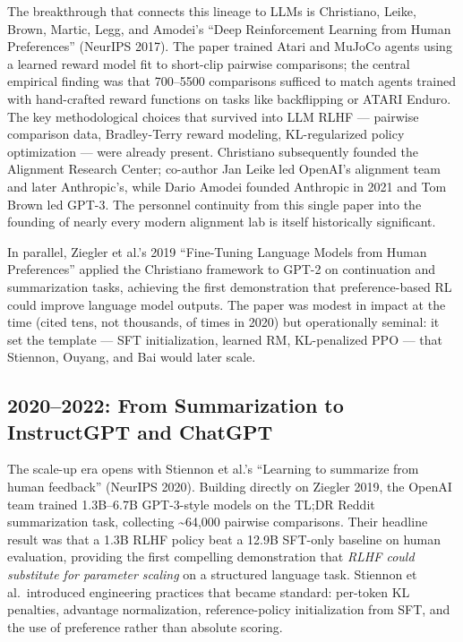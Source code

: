 The breakthrough that connects this lineage to LLMs is Christiano, Leike, Brown, Martic, Legg, and Amodei's ``Deep Reinforcement Learning from Human Preferences'' (NeurIPS 2017). The paper trained Atari and MuJoCo agents using a learned reward model fit to short-clip pairwise comparisons; the central empirical finding was that 700--5500 comparisons sufficed to match agents trained with hand-crafted reward functions on tasks like backflipping or ATARI Enduro. The key methodological choices that survived into LLM RLHF --- pairwise comparison data, Bradley-Terry reward modeling, KL-regularized policy optimization --- were already present. Christiano subsequently founded the Alignment Research Center; co-author Jan Leike led OpenAI's alignment team and later Anthropic's, while Dario Amodei founded Anthropic in 2021 and Tom Brown led GPT-3. The personnel continuity from this single paper into the founding of nearly every modern alignment lab is itself historically significant.

In parallel, Ziegler et al.'s 2019 ``Fine-Tuning Language Models from Human Preferences'' applied the Christiano framework to GPT-2 on continuation and summarization tasks, achieving the first demonstration that preference-based RL could improve language model outputs. The paper was modest in impact at the time (cited tens, not thousands, of times in 2020) but operationally seminal: it set the template --- SFT initialization, learned RM, KL-penalized PPO --- that Stiennon, Ouyang, and Bai would later scale.

\subsection{2020--2022: From Summarization to InstructGPT and ChatGPT}\label{from-summarization-to-instructgpt-and-chatgpt}

The scale-up era opens with Stiennon et al.'s ``Learning to summarize from human feedback'' (NeurIPS 2020). Building directly on Ziegler 2019, the OpenAI team trained 1.3B--6.7B GPT-3-style models on the TL;DR Reddit summarization task, collecting \textasciitilde64,000 pairwise comparisons. Their headline result was that a 1.3B RLHF policy beat a 12.9B SFT-only baseline on human evaluation, providing the first compelling demonstration that \emph{RLHF could substitute for parameter scaling} on a structured language task. Stiennon et al.~introduced engineering practices that became standard: per-token KL penalties, advantage normalization, reference-policy initialization from SFT, and the use of preference rather than absolute scoring.

